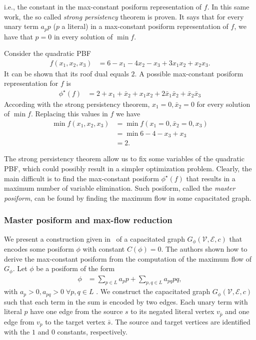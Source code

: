 %
i.e., the constant in the max-constant posiform representation of $f$. In this same work, the so called \emph{strong persistency} theorem is proven. It says that for every unary term $a_pp$ ($p$ a literal) in a max-constant posiform representation of $f$, we have that $p=0$ in every solution of $\min f$.
%
\begin{example}
Consider the quadratic PBF 
\begin{align*}
	f(x_1,x_2,x_3) &= 6-x_1-4x_2-x_3+3x_1x_2+x_2x_3.
\end{align*}
%
It can be shown that its roof dual equals $2$. A possible max-constant posiform representation for $f$ is
\begin{align*}
	\phi^{\star}(f) &= 2 + x_1 + \bar{x}_2 + x_1x_2 +2\bar{x}_1\bar{x}_2 + \bar{x}_2\bar{x}_3
\end{align*}
%
According with the strong persistency theorem, $x_1=0,\bar{x}_2=0$ for every solution of $\min f$. Replacing this values in $f$ we have
\begin{align*}
	\min f(x_1,x_2,x_3) &=\min f(x_1=0,\bar{x}_2=0,x_3) \\
	&= \min 6 - 4 - x_3 + x_3 \\
	&= 2.
\end{align*}
\end{example}
%
The strong persistency theorem allow us to fix some variables of the quadratic PBF, which could possibly result in a simpler optimization problem. Clearly, the main difficult is to find the max-constant posiform $\phi^{\star}(f)$ that results in a maximum number of variable elimination. Such posiform, called the \emph{master posiform}, can be found by finding the maximum flow in some capacitated graph.

\subsubsection{Master posiform and max-flow reduction}

We present a construction given in~\cite{boros91,boros02pseudo} of a capacitated graph $G_{\phi}(\mathcal{V},\mathcal{E},c)$ that encodes some posiform $\phi$ with constant $C(\phi)=0$. The authors shown how to derive the max-constant posiform from the computation of the maximum flow of $G_{\phi}$. Let $\phi$ be a posiform of the form
	\begin{align*}
		\phi &= \sum_{p \in L}{a_pp} + \sum_{p,q \in L}{a_{pq}pq},
	\end{align*}
%
with $a_p >0, a_{pq}>0\; \forall p,q \in L$	. We  construct the capacitated graph $G_{\phi}(\mathcal{V},\mathcal{E},c)$ such that each term in the sum is encoded by two edges. Each unary term with literal $p$ have one edge from the source $s$ to its negated literal vertex $v_{\bar{p}}$ and one edge from $v_p$ to the target vertex $\bar{s}$. The source and target vertices are identified with the $1$ and $0$ constants, respectively. 

